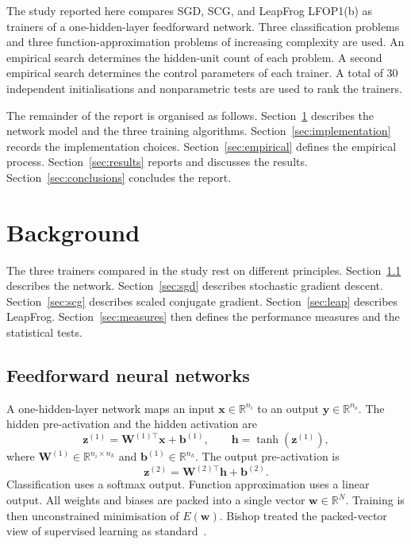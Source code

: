 \documentclass[conference,10pt]{IEEEtran}
\begin{document}
The study reported here compares SGD, SCG, and LeapFrog LFOP1(b) as trainers of a one-hidden-layer feedforward network.
Three classification problems and three function-approximation problems of increasing complexity are used.
An empirical search determines the hidden-unit count of each problem.
A second empirical search determines the control parameters of each trainer.
A total of 30 independent initialisations and nonparametric tests are used to rank the trainers.

The remainder of the report is organised as follows.
Section~\ref{sec:background} describes the network model and the three training algorithms.
Section~\ref{sec:implementation} records the implementation choices.
Section~\ref{sec:empirical} defines the empirical process.
Section~\ref{sec:results} reports and discusses the results.
Section~\ref{sec:conclusions} concludes the report.

\section{Background}
\label{sec:background}
The three trainers compared in the study rest on different principles.
Section~\ref{sec:ffnn} describes the network.
Section~\ref{sec:sgd} describes stochastic gradient descent.
Section~\ref{sec:scg} describes scaled conjugate gradient.
Section~\ref{sec:leap} describes LeapFrog.
Section~\ref{sec:measures} then defines the performance measures and the statistical tests.

\subsection{Feedforward neural networks}
\label{sec:ffnn}
A one-hidden-layer network maps an input $\mathbf{x}\in\mathbb{R}^{n_{i}}$ to an output $\mathbf{y}\in\mathbb{R}^{n_{o}}$.
The hidden pre-activation and the hidden activation are
\begin{equation}
\mathbf{z}^{(1)} = \mathbf{W}^{(1)\top}\mathbf{x}+\mathbf{b}^{(1)}, \qquad
\mathbf{h} = \tanh(\mathbf{z}^{(1)}),
\end{equation}
where $\mathbf{W}^{(1)}\in\mathbb{R}^{n_{i}\times n_{h}}$ and $\mathbf{b}^{(1)}\in\mathbb{R}^{n_{h}}$.
The output pre-activation is
\begin{equation}
\mathbf{z}^{(2)} = \mathbf{W}^{(2)\top}\mathbf{h}+\mathbf{b}^{(2)}.
\end{equation}
Classification uses a softmax output.
Function approximation uses a linear output.
All weights and biases are packed into a single vector $\mathbf{w}\in\mathbb{R}^{N}$.
Training is then unconstrained minimisation of $E(\mathbf{w})$.
Bishop treated the packed-vector view of supervised learning as standard~\cite{bishop1995}.
\end{document}
